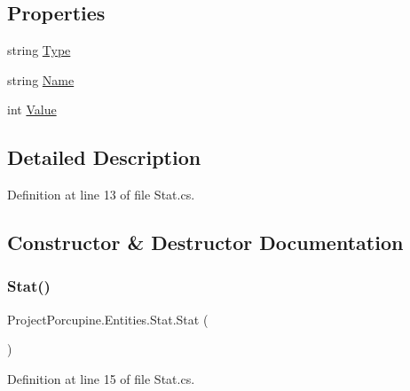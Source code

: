 \subsection*{Properties}
\begin{DoxyCompactItemize}
\item 
string \hyperlink{class_project_porcupine_1_1_entities_1_1_stat_a8da7ba747e7bc697d3315b4ae6b613ea}{Type}
\item 
string \hyperlink{class_project_porcupine_1_1_entities_1_1_stat_a1700d91775cafd3c5e7f5f9d069836bb}{Name}
\item 
int \hyperlink{class_project_porcupine_1_1_entities_1_1_stat_a33e8c2fa06b2d09ddd0c087d163ab808}{Value}
\end{DoxyCompactItemize}


\subsection{Detailed Description}


Definition at line 13 of file Stat.\+cs.



\subsection{Constructor \& Destructor Documentation}
\mbox{\label{class_project_porcupine_1_1_entities_1_1_stat_acbcdcdcce6742758fccbe935e9813bd2}} 
\subsubsection{\texorpdfstring{Stat()}{Stat()}}
{\footnotesize\ttfamily Project\+Porcupine.\+Entities.\+Stat.\+Stat (\begin{DoxyParamCaption}{ }\end{DoxyParamCaption})}



Definition at line 15 of file Stat.\+cs.



